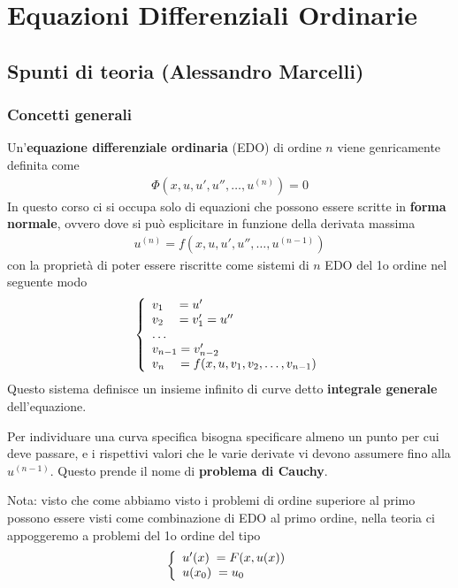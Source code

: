 \chapter{Equazioni Differenziali Ordinarie}



\section{Spunti di teoria (Alessandro Marcelli)}

\subsection{Concetti generali}

Un'\textbf{equazione differenziale ordinaria} (EDO) di ordine $n$ viene genricamente definita come
\begin{align}
	\Phi(x, u, u', u'', \dots, u^{(n)}) = 0
\end{align}
In questo corso ci si occupa solo di equazioni che possono essere scritte in \textbf{forma normale}, ovvero dove si può esplicitare in funzione della derivata massima
\begin{align}
	u^{(n)}=f(x, u, u', u'', \dots, u^{(n-1)})
\end{align}
con la proprietà di poter essere riscritte come sistemi di $n$ EDO del 1o ordine
nel seguente modo
\begin{align}
	\left\{\begin{array}{c}
		v_1 \quad = u' \hfill \\
		v_2 \quad = v_1' = u'' \hfill \\
		\dots \hfill \\
		v_{n-1} = v_{n-2}' \hfill \\
		v_n \quad = f(x, u, v_1, v_2, \dots, v_{n-1}) \hfill 
	\end{array}
	\right.
\end{align}
Questo sistema definisce un insieme infinito di curve detto \textbf{integrale generale} dell'equazione.

Per individuare una curva specifica bisogna specificare almeno un punto  per cui deve passare, e i rispettivi valori che le varie derivate vi devono assumere fino alla $u^{(n-1)}$. Questo prende il nome di \textbf{problema di Cauchy}.

Nota: visto che come abbiamo visto i problemi di ordine superiore al primo possono essere visti come combinazione di EDO al primo ordine, nella teoria ci appoggeremo a problemi del 1o ordine del tipo
\begin{align}
	\left\{\begin{array}{c}
		u'(x) \; = F(x,u(x)) \hfill \\
		u(x_0) \;  = u_0 \hfill 
	\end{array}
	\right.
\end{align}

